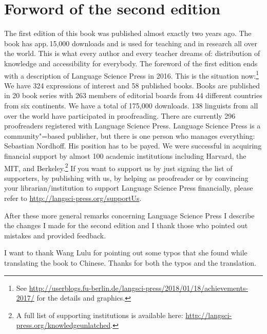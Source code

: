 
\section*{Forword of the second edition}

\addlines[1]
The first edition of this book was published almost exactly two years ago. The book has app.\,15,000
downloads and is used for teaching and in research all over the world. This is what every author and
every teacher dreams of: distribution of knowledge and accessibility for everybody. The foreword of
the first edition ends with a description of Language Science Press in 2016. This is the situation
now:\footnote{
  See \url{http://userblogs.fu-berlin.de/langsci-press/2018/01/18/achievements-2017/} for the
  details and graphics.
} We have 324 expressions of interest and 58 published books. Books are published in 20 book series with 263 members of editorial boards from 44
different countries from six continents. We have a total of 175,000 downloads. 138 linguists from
all over the world have participated in proofreading. There are currently 296 proofreaders
registered with Language Science Press. Language Science Press is a community"=based publisher, but
there is one person who manages everything: Sebastian Nordhoff. His
position has to be payed. We were successful in acquiring financial support by almost 100 academic institutions including 
Harvard, the MIT, and Berkeley.\footnote{
  A full list of supporting institutions is available here:
  \url{http://langsci-press.org/knowledgeunlatched}.
}
If you want to support us by just signing the list of supporters, by publishing with us, by helping as proofreader or by
convincing your librarian/institution to support Language Science Press financially, please refer to \url{http://langsci-press.org/supportUs}.



After these more general remarks concerning Language Science Press I describe the changes I made for the second edition and I
thank those who pointed out mistakes and provided feedback.

I want to thank Wang Lulu for pointing out some typos that she found while translating the book to
Chinese. Thanks for both the typos and the translation.

